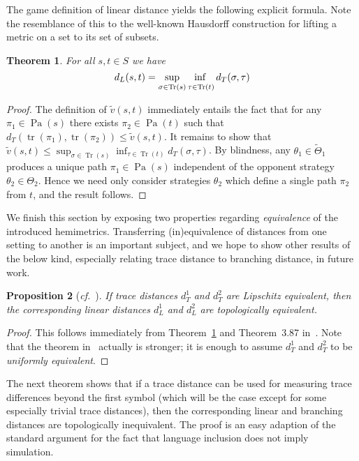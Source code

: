 \documentclass[copyright,creativecommons,sharealike]{eptcs}
\theoremstyle{plain}
\newtheorem{theorem}{Theorem}
\newtheorem{proposition}[theorem]{Proposition}
\newcommand*\Strat{\Theta}
\newcommand*\Stratblind{\tilde \Strat}
\DeclareMathOperator{\Tr}{Tr} \DeclareMathOperator{\Pa}{Pa} \DeclareMathOperator{\fPa}{fPa} \DeclareMathOperator{\tr}{tr} \DeclareMathOperator{\len}{len} \newcommand*\bigmid{\mathrel{\big|}}
\newcommand*\cf{\textit{cf.}}
\newcommand*\vblind{\tilde v}
\begin{document}
The game definition of linear distance yields the following explicit
formula.  Note the resemblance of this to the well-known Hausdorff
construction for lifting a metric on a set to its set of subsets.

\begin{theorem}
  \label{thm:dl-formula}
  For all $s, t\in S$ we have
  \begin{equation*}
    d_L( s, t)= \adjustlimits \sup_{ \sigma\in \Tr( s)} \inf_{ \tau\in
      \Tr( t)} d_T( \sigma, \tau)
  \end{equation*}
\end{theorem}

\begin{proof}
  The definition of $\vblind( s, t)$ immediately entails the fact that
  for any $\pi_1 \in \Pa(s)$ there exists $\pi_2\in\Pa(t)$ such that
  $d_T(\tr(\pi_1),\tr(\pi_2)) \le \vblind( s, t)$. It remains to show
  that $\vblind(s,t)\le \sup_{ \sigma\in \Tr( s)} \inf_{ \tau\in \Tr(
    t)} d_T( \sigma, \tau)$.
  By blindness, any $\theta_1\in\Stratblind_1$ produces a unique path
  $\pi_1 \in \Pa(s)$ independent of the opponent strategy
  $\theta_2\in\Strat_2$.  Hence we need only consider strategies
  $\theta_2$ which define a single path $\pi_2$ from $t$, and the
  result follows.
\end{proof}

We finish this section by exposing two properties regarding
\emph{equivalence} of the introduced hemimetrics.  Transferring
(in)equivalence of distances from one setting to another is an
important subject, and we hope to show other results of the below
kind, especially relating trace distance to branching distance, in
future work.

\begin{proposition}[\cf~{\cite[Thm.~3.87]{aliprantis2007infinite}}]
  If trace distances $d_T^1$ and $d_T^2$ are Lipschitz equivalent,
  then the corresponding linear distances $d_L^1$ and $d_L^2$ are
  topologically equivalent.
\end{proposition}

\begin{proof}
  This follows immediately from Theorem~\ref{thm:dl-formula} and
  Theorem~3.87 in~\cite{aliprantis2007infinite}.  Note that the
  theorem in~\cite{aliprantis2007infinite} actually is stronger; it is
  enough to assume $d_T^1$ and $d_T^2$ to be \emph{uniformly
    equivalent}.
\end{proof}

The next theorem shows that if a trace distance can be used for
measuring trace differences beyond the first symbol (which will be the
case except for some especially trivial trace distances), then the
corresponding linear and branching distances are topologically
inequivalent.  The proof is an easy adaption of the standard argument
for the fact that language inclusion does not imply simulation.
\end{document}
